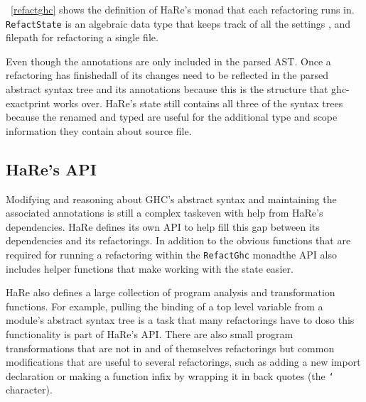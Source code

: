 \DIFdelbegin {}\DIFdelend \DIFaddbegin {}\DIFaddend ~\ref{refactghc} shows the definition of HaRe's monad that each refactoring runs in. \texttt{RefactState} is an algebraic data type that keeps track of all the settings \DIFaddbegin {}\DIFaddend , \DIFdelbegin {}\DIFdelend and filepath for refactoring a single file.
\DIFdelbegin {}\texttt{} %
\DIFdelend 

Even though \DIFdelbegin {}\DIFdelend the \DIFaddbegin {}\DIFaddend annotations are only included in the parsed AST. Once a refactoring has finished\DIFaddbegin \DIFadd{, }\DIFaddend all of its changes need to be reflected in the parsed abstract syntax tree and its annotations because this is the structure that ghc-exactprint works over. HaRe's state still contains all three of the syntax trees because the renamed and typed \DIFdelbegin {}\DIFdelend \DIFaddbegin {}\DIFaddend are useful for the additional type and scope information they contain about \DIFdelbegin {}\DIFdelend \DIFaddbegin {}\DIFaddend source file. 

\subsection{HaRe's API}

Modifying and reasoning about GHC's abstract syntax and maintaining the associated annotations is still a complex task\DIFaddbegin \DIFadd{, }\DIFaddend even with help from HaRe's dependencies. HaRe defines its own API to help fill this gap between its dependencies and its refactorings. In addition to the obvious functions that are required for running a refactoring within the \texttt{RefactGhc} monad\DIFaddbegin \DIFadd{, }\DIFaddend the API also includes helper functions that make working with the state easier. 

HaRe also defines a large collection of program analysis and transformation functions. For example, pulling the binding of a top level variable from a module's \DIFdelbegin {}\DIFdelend abstract syntax tree is a task that many refactorings have to do\DIFaddbegin \DIFadd{, }\DIFaddend so this functionality is part of HaRe's API. There are also small program transformations that are not in and of themselves refactorings but common \DIFdelbegin {}\DIFdelend \DIFaddbegin {}\DIFaddend modifications that are useful to several refactorings, such as adding a new import declaration or making a function infix by wrapping it in back quotes (the \texttt{`} character).

